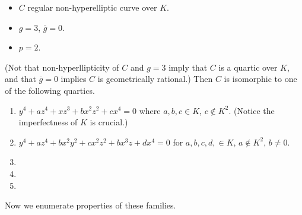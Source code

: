 \begin{theorem}
\label{theorem-classification-quartics}
\begin{itemize}
\item $C$ regular non-hyperelliptic curve
over $K$.
\item  $g=3$, $\overline{g}=0$.
\item $p=2$.
\end{itemize}
(Not that non-hyperllipticity of $C$ and
$g=3$ imply that $C$ is a quartic
over $K$, and that  $\overline{g}=0$ implies
$C$ is geometrically rational.)
Then $C$ is isomorphic to one of the
following quartics.

\begin{enumerate}
\item $y^4+az^4+xz^3+bx^2z^2+cx^4=0$ where
$a,b,c \in K$, $c \not \in K^2$.
(Notice the imperfectness of $K$ is crucial.)

\item $y^4+az^4+bx^2y^2+cx^2z^2+bx^3z+dx^4=0$
for $a,b,c,d, \in K$,
$a \not \in K^2$, $b\not =0$.

\item
\item
\item
\end{enumerate}
\end{theorem}

\noindent
Now we enumerate properties of these
families.

